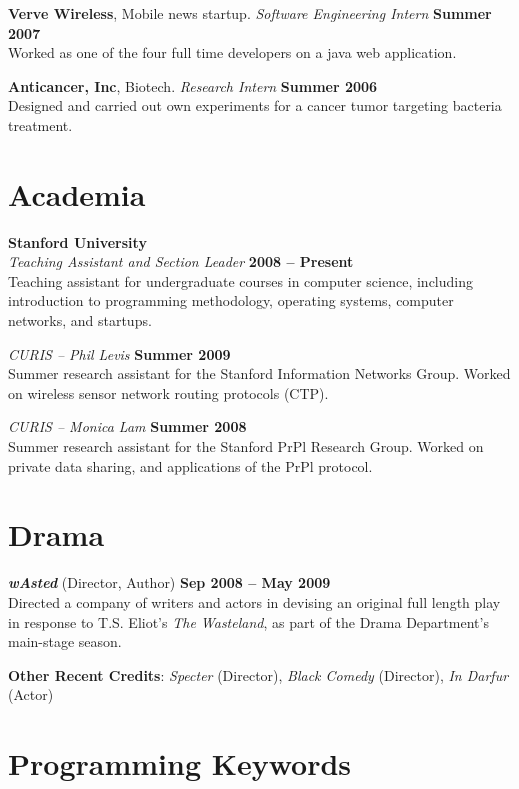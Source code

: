 \documentclass[margin,line]{resume}
\begin{document}
\begin{resume}
    \textbf{Verve Wireless}, Mobile news startup.
      \textsl{Software Engineering Intern}
      \hfill \textbf{Summer 2007}\\
    Worked as one of the four full time developers on a java web application.

    \textbf{Anticancer, Inc}, Biotech.
      \textsl{Research Intern}
      \hfill \textbf{Summer 2006}\\
    Designed and carried out own experiments for a cancer tumor targeting
    bacteria treatment.

    \section{\mysidestyle Academia}

    \textbf{Stanford University} \vspace{2mm}\\%
    \textsl{Teaching Assistant and Section Leader} \hfill \textbf{2008 -- Present}\\
    Teaching assistant for undergraduate courses in computer science, including introduction to programming methodology, operating systems, computer networks, and startups.

    \textsl{CURIS -- Phil Levis} \hfill \textbf{Summer 2009}\\
    Summer research assistant for the Stanford Information Networks Group. Worked on wireless sensor network routing protocols (CTP).

    \textsl{CURIS -- Monica Lam} \hfill \textbf{Summer 2008}\\
    Summer research assistant for the Stanford PrPl Research Group. Worked on private data sharing, and applications of the PrPl protocol.


    \section{\mysidestyle Drama}
    \textbf{\emph{wAsted}} (Director, Author) \hfill \textbf{Sep 2008 -- May 2009} \\
    Directed a company of writers and actors in devising an original full length play in response to T.S. Eliot's \emph{The Wasteland}, as part of the Drama Department's main-stage season.

    \textbf{Other Recent Credits}: \emph{Specter} (Director), \emph{Black Comedy} (Director), \emph{In Darfur} (Actor) \emph{}


    \section{\mysidestyle Programming Keywords}


\end{resume}
\end{document}
